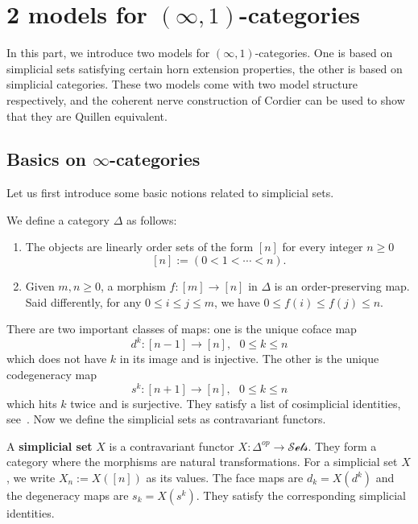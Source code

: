 \chapter{2 models for \((\infty,1)\)-categories}

In this part, we introduce two models for \((\infty,1)\)-categories. One is based on simplicial sets satisfying certain horn extension properties, the other is based on simplicial categories. These two models come with two model structure respectively, and the coherent nerve construction of Cordier can be used to show that they are Quillen equivalent.

\section{Basics on \(\infty\)-categories}

Let us first introduce some basic notions related to simplicial sets.
\begin{definition}
    We define a category \(\Delta\) as follows:
    \begin{enumerate}
        \item The objects are linearly order sets of the form \([n]\) for every integer \(n\geq 0\)
              \[[n]:=(0<1<\cdots<n).\]
        \item Given \(m,n\geq 0\), a morphism \(f:[m]\rightarrow [n]\) in \(\Delta\) is an order-preserving map. Said differently, for any \(0\leq i\leq j\leq m\), we have \(0\leq f(i)\leq f(j)\leq n\).
    \end{enumerate}
\end{definition}

There are two important classes of maps: one is the unique coface map
\[d^k:[n-1]\rightarrow [n],\ \ \ 0\leq k\leq n\]
which does not have \(k\) in its image and is injective. The other is the unique codegeneracy map
\[s^k:[n+1]\rightarrow [n],\ \ \ 0\leq k\leq n\]
which hits \(k\) twice and is surjective. They satisfy a list of cosimplicial identities, see~\cite{goerssSimplicialHomotopyTheory2009}. Now we define the simplicial sets as contravariant functors.

\begin{definition}
    A \textbf{simplicial set} \(X\) is a contravariant functor \(X:\Delta^{op}\rightarrow \mathcal{Sets}\). They form a category where the morphisms are natural transformations. For a simplicial set \(X\), we write \(X_n:=X([n])\) as its values. The face maps are \(d_k=X(d^k)\) and the degeneracy maps are \(s_k=X(s^k)\). They satisfy the corresponding simplicial identities.
\end{definition}

